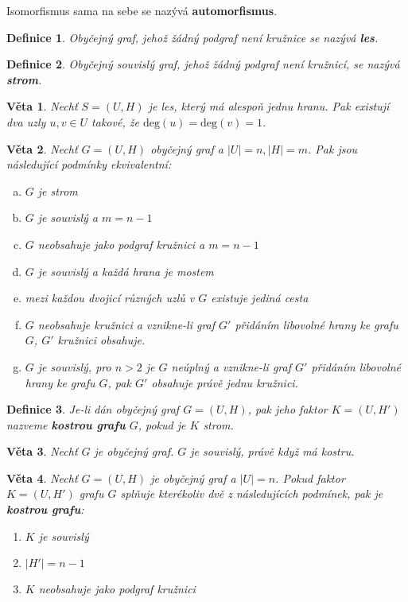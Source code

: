 \documentclass[a4paper, 11pt]{report}
\newtheorem{mydef}{Definice}[chapter]
\newtheorem{veta}{Věta}[chapter]
\begin{document}
Isomorfismus sama na sebe se nazývá \textbf{automorfismus}.

\begin{mydef}
Obyčejný graf, jehož žádný podgraf není kružnice se nazývá \textbf{les}.
\end{mydef}

\begin{mydef}
Obyčejný \emph{souvislý} graf, jehož žádný podgraf není kružnicí, se nazývá \textbf{strom}.
\end{mydef}

\begin{veta}
Nechť $S=(U, H)$ je les, který má alespoň jednu hranu. Pak existují dva uzly $u, v \in U$ takové, že $\text{deg}(u) = \text{deg}(v) = 1$.
\end{veta}

\begin{veta}
Nechť $G=(U, H)$ obyčejný graf a $|U| = n, |H| = m$. Pak jsou následující podmínky ekvivalentní:
\begin{enumerate}[(a)]
	\item $G$ je strom
	\item $G$ je souvislý a $m = n-1$
	\item $G$ neobsahuje jako podgraf kružnici a $m=n -1$
	\item $G$ je souvislý a každá hrana je mostem
	\item mezi každou dvojicí různých uzlů v $G$ existuje jediná cesta
	\item $G$ neobsahuje kružnici a vznikne-li graf $G'$ přidáním libovolné hrany ke grafu $G$, $G'$ kružnici obsahuje.
	\item $G$ je souvislý, pro $n > 2$ je $G$ neúplný a vznikne-li graf $G'$ přidáním libovolné hrany ke grafu $G$, pak $G'$ obsahuje právě jednu kružnici.
\end{enumerate}
\end{veta}

\begin{mydef}
Je-li dán obyčejný graf $G=(U, H)$, pak jeho faktor $K = (U, H')$ nazveme \textbf{kostrou grafu} $G$, pokud je $K$ strom.
\end{mydef}

\begin{veta}
Nechť $G$ je obyčejný graf. $G$ je souvislý, právě když má kostru.
\end{veta}

\begin{veta}
Nechť $G=(U, H)$ je obyčejný graf a $|U|=n$. Pokud faktor $K=(U, H')$ grafu $G$ splňuje kterékoliv dvě z následujících podmínek, pak je \textbf{kostrou grafu}:
\begin{enumerate}
	\item $K$ je souvislý
	\item $|H'| = n-1$
	\item $K$ neobsahuje jako podgraf kružnici
\end{enumerate}
\end{veta}
\end{document}

